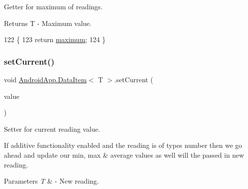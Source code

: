 Getter for maximum of readings. 

\begin{DoxyReturn}{Returns}
T -\/ Maximum value. 
\end{DoxyReturn}

\begin{DoxyCode}
122                           \{
123         \textcolor{keywordflow}{return} \hyperlink{class_android_app_1_1_data_item_a6e53719b27d08f889c4d6460254583dc}{maximum};
124     \}
\end{DoxyCode}
\mbox{\label{class_android_app_1_1_data_item_a6cd8975067d5be2d5eaac137a94c0eac}} 
\subsubsection{\texorpdfstring{set\+Current()}{setCurrent()}}
{\footnotesize\ttfamily void \hyperlink{class_android_app_1_1_data_item}{Android\+App.\+Data\+Item}$<$ T $>$.set\+Current (\begin{DoxyParamCaption}\item[{T}]{value }\end{DoxyParamCaption})\hspace{0.3cm}{\ttfamily [inline]}}



Setter for current reading value. 

If additive functionality enabled and the reading is of types number then we go ahead and update our min, max \& average values as well will the passed in new reading.


\begin{DoxyParams}{Parameters}
{\em T} & -\/ New reading. \\
\hline
\end{DoxyParams}

